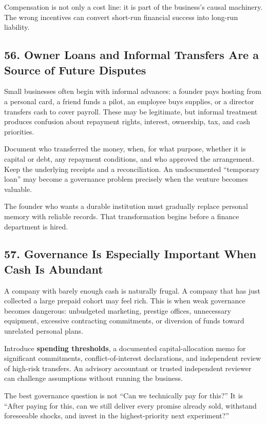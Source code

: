 Compensation is not only a cost line: it is part of the business's causal machinery. The wrong incentives can convert short-run financial success into long-run liability.

\subsection*{56. Owner Loans and Informal Transfers Are a Source of Future Disputes}

Small businesses often begin with informal advances: a founder pays hosting from a personal card, a friend funds a pilot, an employee buys supplies, or a director transfers cash to cover payroll. These may be legitimate, but informal treatment produces confusion about repayment rights, interest, ownership, tax, and cash priorities.

Document who transferred the money, when, for what purpose, whether it is capital or debt, any repayment conditions, and who approved the arrangement. Keep the underlying receipts and a reconciliation. An undocumented ``temporary loan'' may become a governance problem precisely when the venture becomes valuable.

The founder who wants a durable institution must gradually replace personal memory with reliable records. That transformation begins before a finance department is hired.

\subsection*{57. Governance Is Especially Important When Cash Is Abundant}

A company with barely enough cash is naturally frugal. A company that has just collected a large prepaid cohort may feel rich. This is when weak governance becomes dangerous: unbudgeted marketing, prestige offices, unnecessary equipment, excessive contracting commitments, or diversion of funds toward unrelated personal plans.

Introduce \textbf{spending thresholds}, a documented capital-allocation memo for significant commitments, conflict-of-interest declarations, and independent review of high-risk transfers. An advisory accountant or trusted independent reviewer can challenge assumptions without running the business.

The best governance question is not ``Can we technically pay for this?'' It is ``After paying for this, can we still deliver every promise already sold, withstand foreseeable shocks, and invest in the highest-priority next experiment?''

